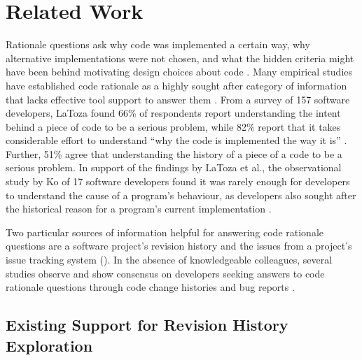 \chapter{Related Work}
\label{ch:Related-Work}

Rationale questions ask why code was implemented a certain way, 
why alternative implementations were not chosen, and what the hidden criteria might have been 
behind motivating design choices about code \cite{latoza_hard-answer_2010}.
Many empirical studies have established code rationale as a highly sought after category of 
information that lacks effective tool support to answer them \cite{latoza_maintaining_2006, latoza_hard-answer_2010, ko_information_2007}. 
From a survey of 157 software developers, LaToza \etal found 66\% of respondents report understanding 
the intent behind a piece of code to be a serious problem, 
while 82\% report that it takes considerable effort to understand ``why the code is implemented the way it is'' \cite{latoza_maintaining_2006}.
Further, 51\% agree that understanding the history of a piece of a code to be a serious problem.
In support of the findings by LaToza et al., the observational study by Ko \etal of 17 software 
developers found it was rarely enough for developers to understand the cause of a program's behaviour, 
as developers also sought after the historical reason for a program's current implementation \cite{ko_information_2007}.

Two particular sources of information  helpful for answering code rationale questions 
are a software project's revision history and the issues from a project's issue tracking system (). 
In the absence of knowledgeable colleagues, several studies observe and show consensus 
on developers seeking answers to code rationale questions through code change histories 
and bug reports \cite{ko_information_2007, codoban_software_2015, robillard_turnover-induced_2021}.


\pagebreak
\section{Existing Support for Revision History Exploration}

